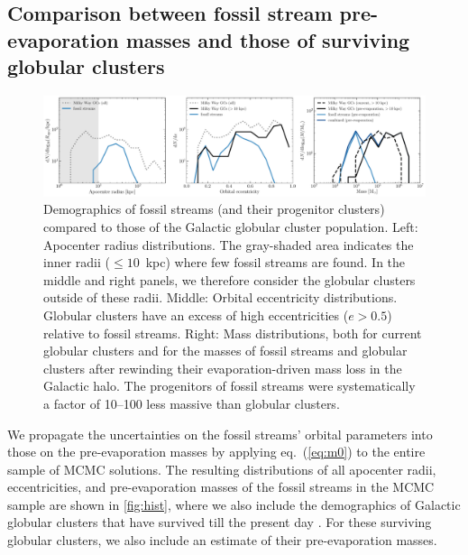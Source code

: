 \documentclass[twocolumn]{aastex63}
\begin{document}
\subsection{Comparison between fossil stream pre-evaporation masses and those of surviving globular clusters}
\begin{figure}
\includegraphics[width=\hsize]{distributions_mc.pdf}%
\caption{
\label{fig:hist}
Demographics of fossil streams (and their progenitor clusters) compared to those of the Galactic globular cluster population. Left: Apocenter radius distributions. The gray-shaded area indicates the inner radii ($\leq10$~kpc) where few fossil streams are found. In the middle and right panels, we therefore consider the globular clusters outside of these radii. Middle: Orbital eccentricity distributions. Globular clusters have an excess of high eccentricities ($e>0.5$) relative to fossil streams. Right: Mass distributions, both for current globular clusters and for the masses of fossil streams and globular clusters after rewinding their evaporation-driven mass loss in the Galactic halo. The progenitors of fossil streams were systematically a factor of 10--100 less massive than globular clusters.}
\end{figure}	
We propagate the uncertainties on the fossil streams' orbital parameters into those on the pre-evaporation masses by applying eq.~(\ref{eq:m0}) to the entire sample of MCMC solutions. The resulting distributions of all apocenter radii, eccentricities, and pre-evaporation masses of the fossil streams in the MCMC sample are shown in \autoref{fig:hist}, where we also include the demographics of Galactic globular clusters that have survived till the present day \citep[2010 edition]{harris96}. For these surviving globular clusters, we also include an estimate of their pre-evaporation masses.
\end{document}

